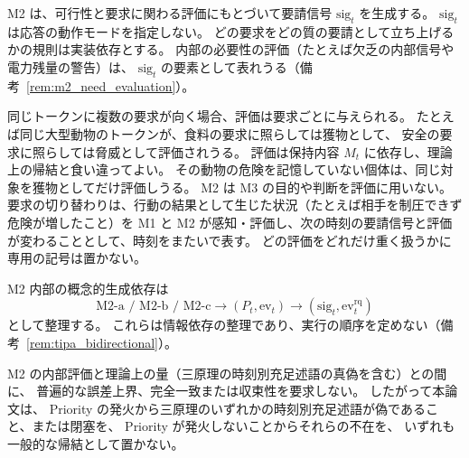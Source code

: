 \begin{definition}
\label{def:m2_request_signal}
M2 は、可行性と要求に関わる評価にもとづいて要請信号 $\mathrm{sig}_t$ を生成する。
$\mathrm{sig}_t$ は応答の動作モードを指定しない。
どの要求をどの質の要請として立ち上げるかの規則は実装依存とする。
内部の必要性の評価（たとえば欠乏の内部信号や電力残量の警告）は、
$\mathrm{sig}_t$ の要素として表れうる（備考~\ref{rem:m2_need_evaluation}）。
\end{definition}

\begin{remark}[要求×対象の評価の読み]
\label{rem:rq_evaluation_reading}
同じトークンに複数の要求が向く場合、評価は要求ごとに与えられる。
たとえば同じ大型動物のトークンが、食料の要求に照らしては獲物として、
安全の要求に照らしては脅威として評価されうる。
評価は保持内容 $M_t$ に依存し、理論上の帰結と食い違ってよい。
その動物の危険を記憶していない個体は、同じ対象を獲物としてだけ評価しうる。
M2 は M3 の目的や判断を評価に用いない。
要求の切り替わりは、行動の結果として生じた状況（たとえば相手を制圧できず危険が増したこと）を
M1 と M2 が感知・評価し、次の時刻の要請信号と評価が変わることとして、時刻をまたいで表す。
どの評価をどれだけ重く扱うかに専用の記号は置かない。
\end{remark}

M2 内部の概念的生成依存は
\[
  \text{M2-a / M2-b / M2-c}
  \longrightarrow
  (P_t,\mathrm{ev}_t)
  \longrightarrow
  (\mathrm{sig}_t,\mathrm{ev}^{\mathrm{rq}}_t)
\]
として整理する。
これらは情報依存の整理であり、実行の順序を定めない（備考~\ref{rem:tipa_bidirectional}）。

\begin{remark}[M2評価の情報品質と非定量性]
\label{rem:error_bounds}
M2 の内部評価と理論上の量（三原理の時刻別充足述語の真偽を含む）との間に、
普遍的な誤差上界、完全一致または収束性を要求しない。
したがって本論文は、
Priority の発火から三原理のいずれかの時刻別充足述語が偽であること、または閉塞を、
Priority が発火しないことからそれらの不在を、
いずれも一般的な帰結として置かない。
\end{remark}

